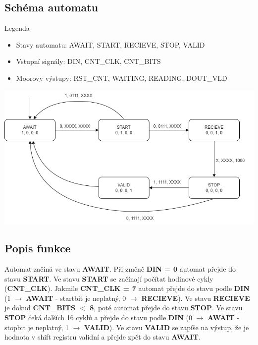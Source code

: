 \documentclass[11pt,a4paper,oneside]{article}
\begin{document}
\subsection*{Schéma automatu}
Legenda
\begin{itemize}
  \item Stavy automatu: AWAIT, START, RECIEVE, STOP, VALID
  \item Vstupní signály: DIN, CNT\_CLK, CNT\_BITS
  \item Moorovy výstupy: RST\_CNT, WAITING, READING, DOUT\_VLD
\end{itemize}
\includegraphics[width=\textwidth,height=\textheight,keepaspectratio]{fsm}
\subsection*{Popis funkce}
Automat začíná ve stavu \textbf{AWAIT}. Při změně \textbf{DIN = 0} automat přejde do stavu \textbf{START}.
Ve stavu \textbf{START} se začínají počítat hodinové cykly (\textbf{CNT\_CLK}).
Jakmile \textbf{CNT\_CLK = 7} automat přejde do stavu podle \textbf{DIN}
(1 $\rightarrow$ \textbf{AWAIT} - startbit je neplatný, 0 $\rightarrow$ \textbf{RECIEVE}).
Ve stavu \textbf{RECIEVE} je dokud \textbf{CNT\_BITS $<$ 8}, poté automat přejde do stavu \textbf{STOP}.
Ve stavu \textbf{STOP} čeká dalších 16 cyklů a přejde do stavu podle \textbf{DIN} (0 $\rightarrow$ \textbf{AWAIT} - stopbit je neplatný, 1 $\rightarrow$ \textbf{VALID}).
Ve stavu \textbf{VALID} se zapíše na výstup, že je hodnota v shift registru validní a přejde zpět do stavu \textbf{AWAIT}.
\newpage
\end{document}
